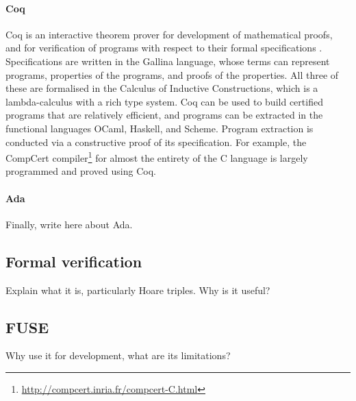 \paragraph{Coq}
Coq is an interactive theorem prover for development of mathematical proofs, and for verification of programs with respect to their formal specifications \cite{coqRM}.
Specifications are written in the Gallina language, whose terms can represent programs, properties of the programs, and proofs of the properties.
All three of these are formalised in the Calculus of Inductive Constructions, which is a lambda-calculus with a rich type system.
Coq can be used to build certified programs that are relatively efficient, and programs can be extracted in the functional languages OCaml, Haskell, and Scheme.
Program extraction is conducted via a constructive proof of its specification.
For example, the CompCert compiler\footnote{\url{http://compcert.inria.fr/compcert-C.html}} for almost the entirety of the C language is largely programmed and proved using Coq.

\paragraph{Ada}
Finally, write here about Ada.

\subsection{Formal verification}
Explain what it is, particularly Hoare triples.
Why is it useful?

\subsection{FUSE}
Why use it for development, what are its limitations?
